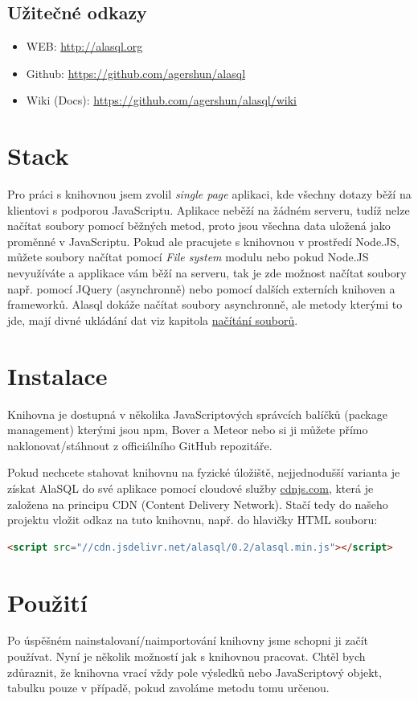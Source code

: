 \documentclass[a4, titlepage]{article}
\begin{document}
\subsection{Užitečné odkazy}
\begin{itemize}
	\item WEB: \url{http://alasql.org}
	\item Github: \url{https://github.com/agershun/alasql}
	\item Wiki (Docs): \url{https://github.com/agershun/alasql/wiki}
\end{itemize}

\section{Stack}
Pro práci s knihovnou jsem zvolil \textit{single page} aplikaci, kde všechny dotazy běží na klientovi s podporou JavaScriptu. Aplikace neběží na žádném serveru, tudíž nelze načítat soubory pomocí běžných metod, proto jsou všechna data uložená jako proměnné v JavaScriptu. Pokud ale pracujete s knihovnou v prostředí Node.JS, můžete soubory načítat pomocí \textit{File system} modulu nebo pokud Node.JS nevyužíváte a applikace vám běží na serveru, tak je zde možnost načítat soubory např. pomocí JQuery (asynchronně) nebo pomocí dalších externích knihoven a frameworků. Alasql dokáže načítat soubory asynchronně, ale metody kterými to jde, mají divné ukládání dat viz kapitola \hyperlink{FileLoading}{načítání souborů}.

\section{Instalace}
Knihovna je dostupná v několika JavaScriptových správcích balíčků (package management) kterými jsou npm, Bover a Meteor nebo si ji můžete přímo naklonovat/stáhnout z officiálního GitHub repozitáře. 

Pokud nechcete stahovat knihovnu na fyzické úložiště, nejjednodušší varianta je získat AlaSQL do své aplikace pomocí cloudové služby \href{https://cdnjs.com/libraries/alasql}{cdnjs.com}, která je založena na principu CDN (Content Delivery Network). Stačí tedy do našeho projektu vložit odkaz na tuto knihovnu, např. do hlavičky HTML souboru:

\begin{lstlisting}[language=HTML]
<script src="//cdn.jsdelivr.net/alasql/0.2/alasql.min.js"></script> 
\end{lstlisting}


\section{Použití}
Po úspěšném nainstalovaní/naimportování knihovny jsme schopni ji začít používat. Nyní je několik možností jak s knihovnou pracovat. Chtěl bych zdůraznit, že knihovna vrací vždy pole výsledků nebo JavaScriptový objekt, tabulku pouze v případě, pokud zavoláme metodu tomu určenou.
\end{document}
